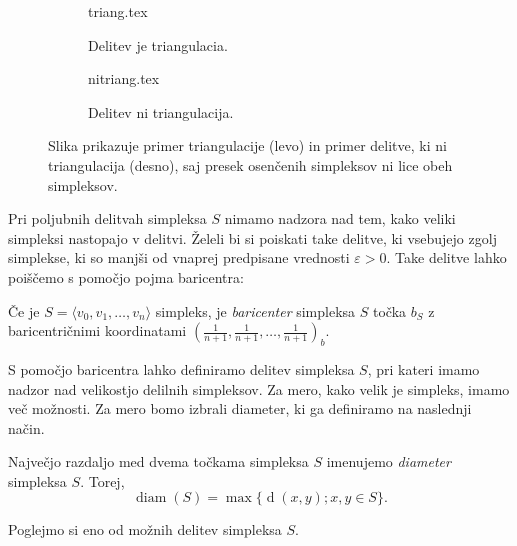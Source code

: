 \documentclass[mat1]{fmfdelo}
\DeclareMathOperator{\diam}{diam}
\DeclareMathOperator{\dist}{d}
\newcommand{\0}{\underline{0}}
\begin{document}
\begin{figure}[h]  
\centering 
	\begin{subfigure}[b]{0.4\linewidth} 
	\centering
		{triang.tex}%
		\caption{Delitev je triangulacia.} \label{fig:triang}
	\end{subfigure}
	\hspace{1cm}
	\begin{subfigure}[b]{0.4\linewidth}
	\centering
		{nitriang.tex}%
		\caption{Delitev ni triangulacija.} \label{fig:nitriang}  
	\end{subfigure}
\caption{Slika prikazuje primer triangulacije (levo) in primer delitve, ki ni triangulacija (desno), saj presek osenčenih simpleksov ni lice obeh simpleksov.}
\end{figure} 
Pri poljubnih delitvah simpleksa $S$ nimamo nadzora nad tem, kako veliki simpleksi nastopajo v delitvi. Želeli bi si poiskati take delitve, ki vsebujejo zgolj simplekse, ki so manjši od vnaprej predpisane vrednosti $\varepsilon > 0$. Take delitve lahko poiščemo s pomočjo pojma baricentra:
\begin{definicija}
Če je $S = \langle v_0, v_1, \dots, v_n \rangle$ simpleks, je \emph{baricenter} simpleksa $S$ točka $b_S$ z baricentričnimi koordinatami $\left( \frac{1}{n+1}, \frac{1}{n+1}, \dots, \frac{1}{n+1} \right )_b$.
\end{definicija}
S pomočjo baricentra lahko definiramo delitev simpleksa $S$, pri kateri imamo nadzor nad velikostjo delilnih simpleksov. Za mero, kako velik je simpleks, imamo več možnosti. Za mero bomo izbrali diameter, ki ga definiramo na naslednji način.
\begin{definicija}
Največjo razdaljo med dvema točkama simpleksa $S$ imenujemo \emph{diameter} simpleksa $S$. Torej,
$$\diam(S) = \max \{ \dist(x, y); x, y \in S\}.$$
\end{definicija}
Poglejmo si eno od možnih delitev simpleksa $S$.
\end{document}

